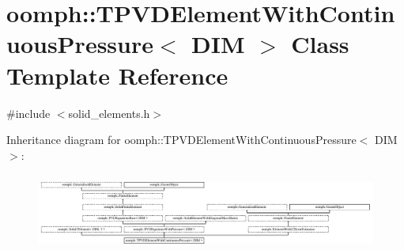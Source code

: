 \hypertarget{classoomph_1_1TPVDElementWithContinuousPressure}{}\section{oomph\+:\+:T\+P\+V\+D\+Element\+With\+Continuous\+Pressure$<$ D\+IM $>$ Class Template Reference}
\label{classoomph_1_1TPVDElementWithContinuousPressure}


{\ttfamily \#include $<$solid\+\_\+elements.\+h$>$}

Inheritance diagram for oomph\+:\+:T\+P\+V\+D\+Element\+With\+Continuous\+Pressure$<$ D\+IM $>$\+:\begin{figure}[H]
\begin{center}
\leavevmode
\includegraphics[height=2.584615cm]{classoomph_1_1TPVDElementWithContinuousPressure}
\end{center}
\end{figure}
